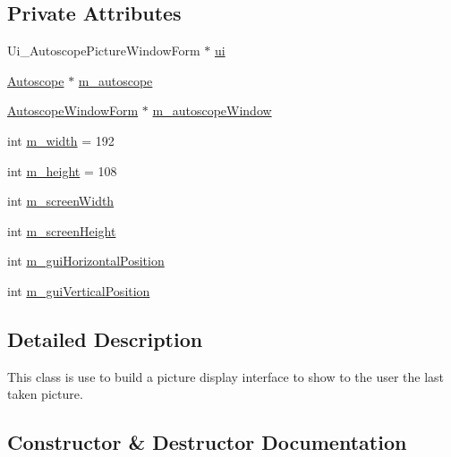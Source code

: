 \subsection*{Private Attributes}
\begin{DoxyCompactItemize}
\item 
Ui\+\_\+\+Autoscope\+Picture\+Window\+Form $\ast$ \mbox{\hyperlink{class_autoscope_picture_window_form_aac9815d1313c1814ff9f0eefa4eeb47d}{ui}}
\item 
\mbox{\hyperlink{class_autoscope}{Autoscope}} $\ast$ \mbox{\hyperlink{class_autoscope_picture_window_form_ab6166280899d69142f4d7ed787c63f8f}{m\+\_\+autoscope}}
\item 
\mbox{\hyperlink{class_autoscope_window_form}{Autoscope\+Window\+Form}} $\ast$ \mbox{\hyperlink{class_autoscope_picture_window_form_ae20e4b58eec25e79ec4a0b5b7fa10e21}{m\+\_\+autoscope\+Window}}
\item 
int \mbox{\hyperlink{class_autoscope_picture_window_form_aa5dacd6f9d13d4cafa98edae38d161f5}{m\+\_\+width}} = 192
\item 
int \mbox{\hyperlink{class_autoscope_picture_window_form_aba2d2633eaffee2cff0babc6db1ab1e4}{m\+\_\+height}} = 108
\item 
int \mbox{\hyperlink{class_autoscope_picture_window_form_a0bf8e1210cdea9fcf58b0153d52b7f6c}{m\+\_\+screen\+Width}}
\item 
int \mbox{\hyperlink{class_autoscope_picture_window_form_a760dd289327d7731dd40dd9f3543588a}{m\+\_\+screen\+Height}}
\item 
int \mbox{\hyperlink{class_autoscope_picture_window_form_ab85a9e8a721d8b8f9d50c03d7dd91eaf}{m\+\_\+gui\+Horizontal\+Position}}
\item 
int \mbox{\hyperlink{class_autoscope_picture_window_form_acc65dba5ea960c1c8e38267b913a67d3}{m\+\_\+gui\+Vertical\+Position}}
\end{DoxyCompactItemize}


\subsection{Detailed Description}
This class is use to build a picture display interface to show to the user the last taken picture. 

\subsection{Constructor \& Destructor Documentation}
\mbox{\label{class_autoscope_picture_window_form_ac7e1f8a94457cce24469119ea3214f8a}} 
